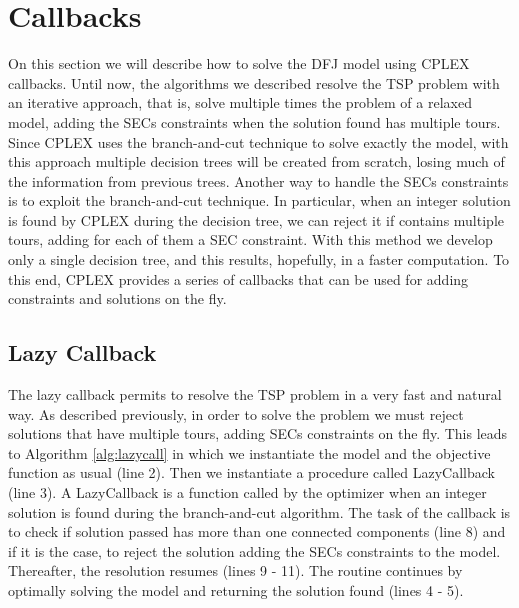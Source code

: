 \clearpage
\section{Callbacks}
On this section we will describe how to solve the DFJ model using CPLEX callbacks. Until now, the algorithms we described resolve the TSP problem with an iterative approach, that is, solve multiple times the problem of a relaxed model, adding the SECs constraints when the solution found has multiple tours. Since CPLEX uses the branch-and-cut technique to solve exactly the model, with this approach multiple decision trees will be created from scratch, losing much of the information from previous trees. Another way to handle the SECs constraints is to exploit the branch-and-cut technique. In particular, when an integer solution is found by CPLEX during the decision tree, we can reject it if contains multiple tours, adding for each of them a SEC constraint. With this method we develop only a single decision tree, and this results, hopefully, in a faster computation. To this end, CPLEX provides a series of callbacks that can be used for adding constraints and solutions on the fly.

\subsection{Lazy Callback}
The lazy callback permits to resolve the TSP problem in a very fast and natural way. As described previously, in order to solve the problem we must reject solutions that have multiple tours, adding SECs constraints on the fly. This leads to Algorithm \ref{alg:lazycall} in which we instantiate the model and the objective function as usual (line 2). Then we instantiate a procedure called LazyCallback (line 3). A LazyCallback is a function called by the optimizer when an integer solution is found during the branch-and-cut algorithm. The task of the callback is to check if solution passed has more than one connected components (line 8) and if it is the case, to reject the solution adding the SECs constraints to the model. Thereafter, the resolution resumes (lines 9 - 11).
The routine continues by optimally solving the model and returning the solution found (lines 4 - 5).


